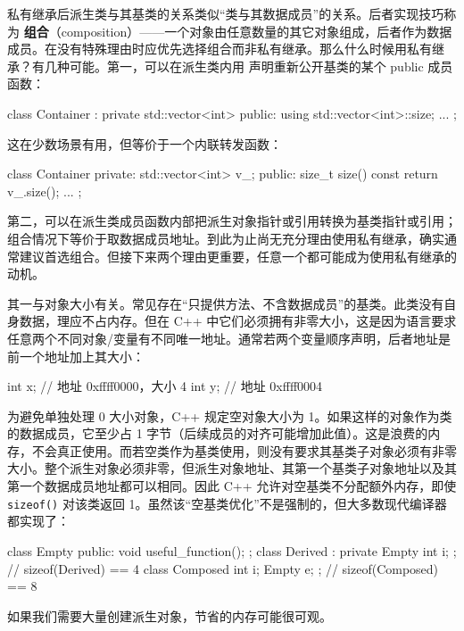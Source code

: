 私有继承后派生类与其基类的关系类似“类与其数据成员”的关系。后者实现技巧称为 \textbf{组合}（composition）——一个对象由任意数量的其它对象组成，后者作为数据成员。在没有特殊理由时应优先选择组合而非私有继承。那么什么时候用私有继承？有几种可能。第一，可以在派生类内用  声明重新公开基类的某个 public 成员函数：

\begin{code}
class Container : private std::vector<int> {
  public:
  using std::vector<int>::size;
  ...
};
\end{code}

这在少数场景有用，但等价于一个内联转发函数：

\begin{code}
class Container {
  private:
  std::vector<int> v_;
  public:
  size_t size() const { return v_.size(); }
  ...
};
\end{code}

第二，可以在派生类成员函数内部把派生对象指针或引用转换为基类指针或引用；组合情况下等价于取数据成员地址。到此为止尚无充分理由使用私有继承，确实通常建议首选组合。但接下来两个理由更重要，任意一个都可能成为使用私有继承的动机。

其一与对象大小有关。常见存在“只提供方法、不含数据成员”的基类。此类没有自身数据，理应不占内存。但在 C++ 中它们必须拥有非零大小，这是因为语言要求任意两个不同对象/变量有不同唯一地址。通常若两个变量顺序声明，后者地址是前一个地址加上其大小：

\begin{code}
int x;     // 地址 0xffff0000，大小 4
int y;     // 地址 0xffff0004
\end{code}

为避免单独处理 0 大小对象，C++ 规定空对象大小为 1。如果这样的对象作为类的数据成员，它至少占 1 字节（后续成员的对齐可能增加此值）。这是浪费的内存，不会真正使用。而若空类作为基类使用，则没有要求其基类子对象必须有非零大小。整个派生对象必须非零，但派生对象地址、其第一个基类子对象地址以及其第一个数据成员地址都可以相同。因此 C++ 允许对空基类不分配额外内存，即使 \texttt{sizeof()} 对该类返回 1。虽然该“空基类优化”不是强制的，但大多数现代编译器都实现了：

\begin{code}
class Empty {
  public:
  void useful_function();
};
class Derived : private Empty {
  int i;
};    // sizeof(Derived) == 4
class Composed {
  int i;
  Empty e;
};    // sizeof(Composed) == 8
\end{code}

如果我们需要大量创建派生对象，节省的内存可能很可观。

